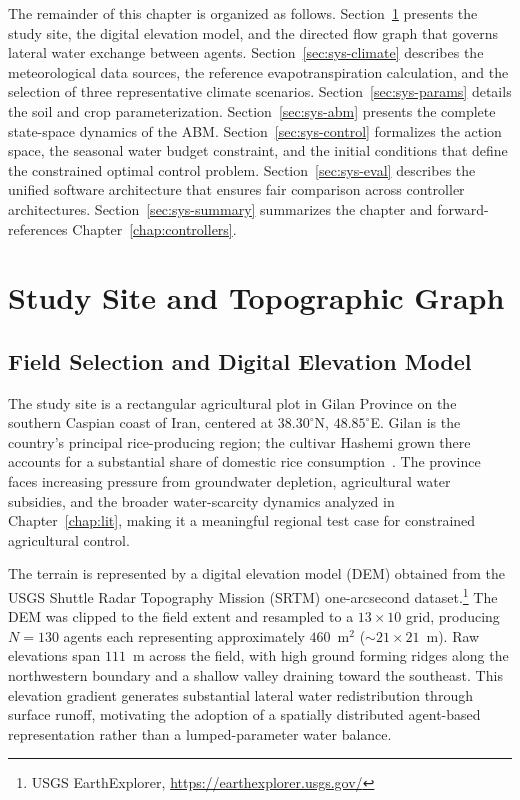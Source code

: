 The remainder of this chapter is organized as follows.
Section~\ref{sec:sys-site} presents the study site, the digital elevation
model, and the directed flow graph that governs lateral water exchange
between agents. Section~\ref{sec:sys-climate} describes the meteorological
data sources, the reference evapotranspiration calculation, and the
selection of three representative climate scenarios.
Section~\ref{sec:sys-params} details the soil and crop parameterization.
Section~\ref{sec:sys-abm} presents the complete state-space dynamics of
the ABM. Section~\ref{sec:sys-control} formalizes the action space, the
seasonal water budget constraint, and the initial conditions that define
the constrained optimal control problem.
Section~\ref{sec:sys-eval} describes the unified software architecture
that ensures fair comparison across controller architectures.
Section~\ref{sec:sys-summary} summarizes the chapter and forward-references
Chapter~\ref{chap:controllers}.

\section{Study Site and Topographic Graph}
\label{sec:sys-site}

\subsection{Field Selection and Digital Elevation Model}
\label{ssec:sys-dem}

The study site is a rectangular agricultural plot in Gilan Province on the
southern Caspian coast of Iran, centered at $38.30^{\circ}$N,
$48.85^{\circ}$E. Gilan is the country's principal rice-producing region;
the cultivar Hashemi grown there accounts for a substantial share of
domestic rice consumption~\cite{surfiran2025,jalali2021}. The province
faces increasing pressure from groundwater depletion, agricultural water
subsidies, and the broader water-scarcity dynamics analyzed in
Chapter~\ref{chap:lit}, making it a meaningful regional test case for
constrained agricultural control.

The terrain is represented by a digital elevation model (DEM) obtained
from the USGS Shuttle Radar Topography Mission (SRTM) one-arcsecond
dataset.\footnote{USGS EarthExplorer,
\url{https://earthexplorer.usgs.gov/}} The DEM was clipped to the field
extent and resampled to a $13 \times 10$ grid, producing $N = 130$ agents
each representing approximately $460$~m$^2$ ($\sim$$21 \times 21$~m).
Raw elevations span $111$~m across the field, with high ground forming
ridges along the northwestern boundary and a shallow valley draining
toward the southeast. This elevation gradient generates substantial
lateral water redistribution through surface runoff, motivating the
adoption of a spatially distributed agent-based representation rather
than a lumped-parameter water balance.

